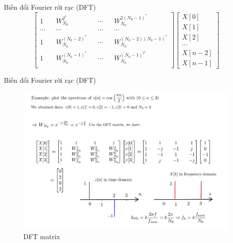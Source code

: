 \documentclass[8pt]{beamer}
\begin{document}
\begin{frame}{Biến đổi Fourier rời rạc (DFT)}
\begin{equation*}
\begin{bmatrix}
		1&&W_{N_{0}}^{2^*}&&\cdots&&W_{N_{0}}^{2(N_{0}-1)^*}\\
		\cdots&&\cdots&&\cdots&&\cdots\\
		1&&W_{N_{0}}^{(N_{0}-2)^*}&&\cdots&& W_{N_{0}}^{(N_{0}-2)(N_{0}-1)^*}\\
		1&&W_{N_{0}}^{(N_{0}-1)^*}&&\cdots&&W_{N_{0}}^{(N_{0}-1)^2^{*}}\\
	\end{bmatrix}
	\begin{bmatrix}
		X[0]\\X[1]\\X[2]\\ \cdots\\X[n-2]\\X[n-1]
	\end{bmatrix}
\end{equation*}
\end{frame}
\begin{frame}{Biến đổi Fourier rời rạc (DFT)}
\begin{figure}[h]
			\includegraphics[width=1\textwidth]{2.jpg}

			\caption{DFT matrix}			\label{fig:re2}

		\end{figure}


\end{frame}
\end{document}
